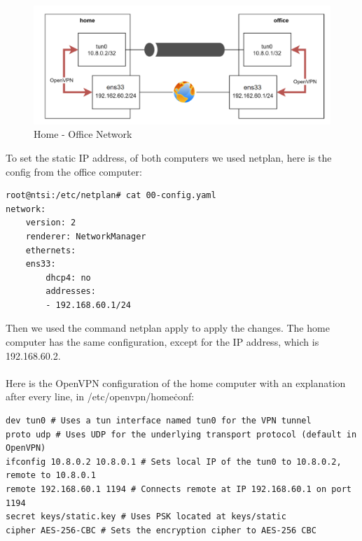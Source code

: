 
\begin{figure}[H]
	\centering
	\includegraphics[width=0.8\linewidth]{Figures/home-office.png}
	\caption{Home - Office Network}
\end{figure}

To set the static IP address, of both computers we used netplan, here is the config from the office computer:

\begin{verbatim}
root@ntsi:/etc/netplan# cat 00-config.yaml 
network:
    version: 2
    renderer: NetworkManager
    ethernets:
    ens33:
        dhcp4: no
        addresses:
        - 192.168.60.1/24
\end{verbatim}

Then we used the command netplan apply to apply the changes. The home computer has the same configuration, except for the IP address, which is 192.168.60.2.
\\\\
Here is the OpenVPN configuration of the home computer with an explanation after every line, in /etc/openvpn/home\.conf:

\begin{verbatim}
dev tun0 # Uses a tun interface named tun0 for the VPN tunnel
proto udp # Uses UDP for the underlying transport protocol (default in OpenVPN)
ifconfig 10.8.0.2 10.8.0.1 # Sets local IP of the tun0 to 10.8.0.2, remote to 10.8.0.1
remote 192.168.60.1 1194 # Connects remote at IP 192.168.60.1 on port 1194
secret keys/static.key # Uses PSK located at keys/static
cipher AES-256-CBC # Sets the encryption cipher to AES-256 CBC
\end{verbatim}

